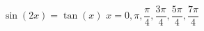 { $\sin(2x) = \tan(x)$}
{ $x = 0, \pi, \dfrac{\pi}{4}, \dfrac{3\pi}{4}, \dfrac{5\pi}{4}, \dfrac{7\pi}{4}$}
